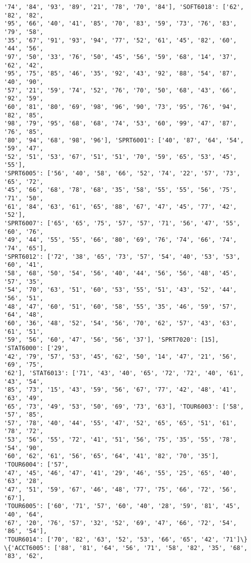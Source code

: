 \documentclass[11pt]{article}
\begin{document}
\begin{Verbatim}[commandchars=\\\{\}]
'74', '84', '93', '89', '21', '78', '70', '84'], 'SOFT6018': ['62', '82', '82',
'95', '66', '40', '41', '85', '70', '83', '59', '73', '76', '83', '79', '58',
'35', '67', '91', '93', '94', '77', '52', '61', '45', '82', '60', '44', '56',
'97', '50', '33', '76', '50', '45', '56', '59', '68', '14', '37', '62', '42',
'95', '75', '85', '46', '35', '92', '43', '92', '88', '54', '87', '40', '90',
'57', '21', '59', '74', '52', '76', '70', '50', '68', '43', '66', '92', '59',
'60', '81', '80', '69', '98', '96', '90', '73', '95', '76', '94', '82', '85',
'98', '79', '95', '68', '68', '74', '53', '60', '99', '47', '87', '76', '85',
'80', '94', '68', '98', '96'], 'SPRT6001': ['40', '87', '64', '54', '59', '47',
'52', '51', '53', '67', '51', '51', '70', '59', '65', '53', '45', '55'],
'SPRT6005': ['56', '40', '58', '66', '52', '74', '22', '57', '73', '65', '72',
'45', '66', '68', '78', '68', '35', '58', '55', '55', '56', '75', '71', '50',
'61', '84', '63', '61', '65', '88', '67', '47', '45', '77', '42', '52'],
'SPRT6007': ['65', '65', '75', '57', '57', '71', '56', '47', '55', '60', '76',
'49', '44', '55', '55', '66', '80', '69', '76', '74', '66', '74', '74', '65'],
'SPRT6012': ['72', '38', '65', '73', '57', '54', '40', '53', '53', '60', '41',
'58', '68', '50', '54', '56', '40', '44', '56', '56', '48', '45', '57', '35',
'54', '70', '63', '51', '60', '53', '55', '51', '43', '52', '44', '56', '51',
'48', '47', '60', '51', '60', '58', '55', '35', '46', '59', '57', '64', '48',
'60', '36', '48', '52', '54', '56', '70', '62', '57', '43', '63', '61', '51',
'59', '56', '60', '47', '56', '56', '37'], 'SPRT7020': [15], 'STAT6000': ['29',
'42', '79', '57', '53', '45', '62', '50', '14', '47', '21', '56', '69', '75',
'62'], 'STAT6013': ['71', '43', '40', '65', '72', '72', '40', '61', '43', '54',
'85', '73', '15', '43', '59', '56', '67', '77', '42', '48', '41', '63', '49',
'65', '73', '49', '53', '50', '69', '73', '63'], 'TOUR6003': ['58', '57', '85',
'57', '78', '40', '44', '55', '47', '52', '65', '65', '51', '61', '78', '72',
'53', '56', '55', '72', '41', '51', '56', '75', '35', '55', '78', '54', '90',
'60', '62', '61', '56', '65', '64', '41', '82', '70', '35'], 'TOUR6004': ['57',
'47', '45', '46', '47', '41', '29', '46', '55', '25', '65', '40', '63', '28',
'47', '51', '59', '67', '46', '48', '77', '75', '66', '72', '56', '67'],
'TOUR6005': ['60', '71', '57', '60', '40', '28', '59', '81', '45', '40', '64',
'67', '20', '76', '57', '32', '52', '69', '47', '66', '72', '54', '86', '54'],
'TOUR6014': ['70', '82', '63', '52', '53', '66', '65', '42', '71']\}
\{'ACCT6005': ['88', '81', '64', '56', '71', '58', '82', '35', '68', '83', '62',

\end{Verbatim}
\end{document}
